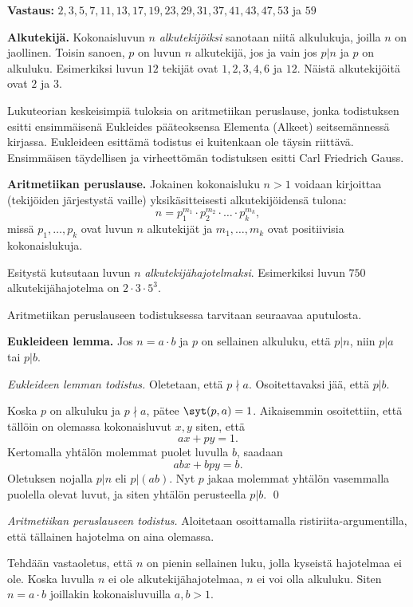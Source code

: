 {\bf Vastaus:} $2, 3, 5, 7, 11, 13, 17, 19, 23, 29, 31, 37, 41, 43, 47, 53$ ja $59$

{\bf Alkutekijä.} Kokonaisluvun $n$ {\em alkutekijöiksi} sanotaan niitä alkulukuja, joilla $n$ on jaollinen. Toisin sanoen, $p$ on luvun $n$ alkutekijä, jos ja vain jos $p|n$ ja $p$ on alkuluku.  Esimerkiksi luvun $12$ tekijät ovat $1, 2, 3, 4, 6$ ja $12$. Näistä alkutekijöitä ovat $2$ ja $3$.


Lukuteorian keskeisimpiä tuloksia on aritmetiikan peruslause, jonka todistuksen esitti ensimmäisenä Eukleides pääteoksensa Elementa (Alkeet) seitsemännessä kirjassa. Eukleideen esittämä todistus ei kuitenkaan ole täysin riittävä. Ensimmäisen täydellisen ja virheettömän todistuksen esitti Carl Friedrich Gauss.

{\bf Aritmetiikan peruslause.} Jokainen kokonaisluku $n>1$ voidaan kirjoittaa (tekijöiden järjestystä vaille) yksikäsitteisesti alkutekijöidensä tulona:
\[
n= p_1^{m_1} \cdot p_2^{m_2} \cdot \ldots \cdot p_k^{m_k},
\]
missä $p_1,\ldots,p_k$ ovat luvun $n$ alkutekijät ja $m_1,\ldots,m_k$ ovat positiivisia kokonaislukuja.

Esitystä kutsutaan luvun $n$ {\em alkutekijähajotelmaksi}. Esimerkiksi luvun $750$ alkutekijähajotelma on $2\cdot 3\cdot 5^3$.

Aritmetiikan peruslauseen todistuksessa tarvitaan seuraavaa aputulosta.

{\bf Eukleideen lemma.} Jos $n=a\cdot b$ ja $p$ on sellainen alkuluku, että $p|n$, niin $p|a$ tai $p|b$.

{\it Eukleideen lemman todistus.} Oletetaan, että $p\nmid a$. Osoitettavaksi jää, että $p|b$.

Koska $p$ on alkuluku ja $p \nmid a$, pätee $\syt(p,a)=1$. Aikaisemmin osoitettiin, että tällöin on olemassa kokonaisluvut $x,y$ siten, että
\[
ax+py = 1.
\]
Kertomalla yhtälön molemmat puolet luvulla $b$, saadaan
\[
abx+bpy = b.
\]
Oletuksen nojalla $p|n$ eli $p|(ab)$. Nyt $p$ jakaa molemmat yhtälön vasemmalla puolella olevat luvut, ja siten yhtälön perusteella $p|b$. 
\qed


{\it Aritmetiikan peruslauseen todistus.}
Aloitetaan osoittamalla ristiriita-argumentilla, että tällainen hajotelma on aina olemassa.

Tehdään vastaoletus, että $n$ on pienin sellainen luku, jolla kyseistä hajotelmaa ei ole. Koska luvulla $n$ ei ole alkutekijähajotelmaa, $n$ ei voi olla alkuluku. Siten $n=a\cdot b$ joillakin kokonaisluvuilla $a,b> 1$.

